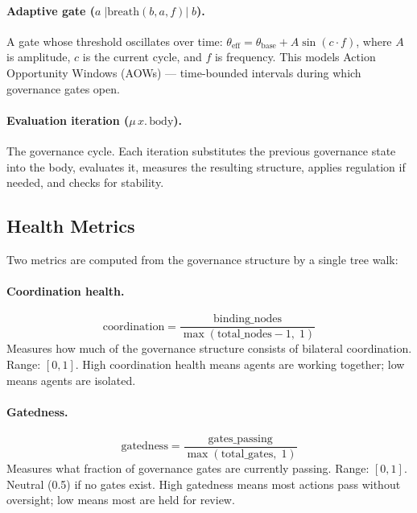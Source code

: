 \documentclass[sigconf,nonacm]{acmart}
\begin{document}
\paragraph{Adaptive gate ($a\;|\mathrm{breath}(b,a,f)|\;b$).}
A gate whose threshold oscillates over time:
$\theta_{\mathrm{eff}} = \theta_{\mathrm{base}} + A \sin(c \cdot f)$,
where $A$ is amplitude, $c$ is the current cycle, and $f$ is frequency.
This models Action Opportunity Windows (AOWs) --- time-bounded intervals
during which governance gates open.

\paragraph{Evaluation iteration ($\mu\, x.\, \mathrm{body}$).}
The governance cycle. Each iteration substitutes the previous governance
state into the body, evaluates it, measures the resulting structure,
applies regulation if needed, and checks for stability.

\subsection{Health Metrics}

Two metrics are computed from the governance structure by a single tree walk:

\paragraph{Coordination health.}
\begin{equation}\label{eq:coordination}
  \mathrm{coordination} = \frac{\text{binding\_nodes}}{\max(\text{total\_nodes} - 1,\; 1)}
\end{equation}
Measures how much of the governance structure consists of bilateral
coordination. Range: $[0, 1]$. High coordination health means agents are
working together; low means agents are isolated.

\paragraph{Gatedness.}
\begin{equation}\label{eq:gatedness}
  \mathrm{gatedness} = \frac{\text{gates\_passing}}{\max(\text{total\_gates},\; 1)}
\end{equation}
Measures what fraction of governance gates are currently passing. Range:
$[0, 1]$. Neutral (0.5) if no gates exist. High gatedness means most
actions pass without oversight; low means most are held for review.
\end{document}
